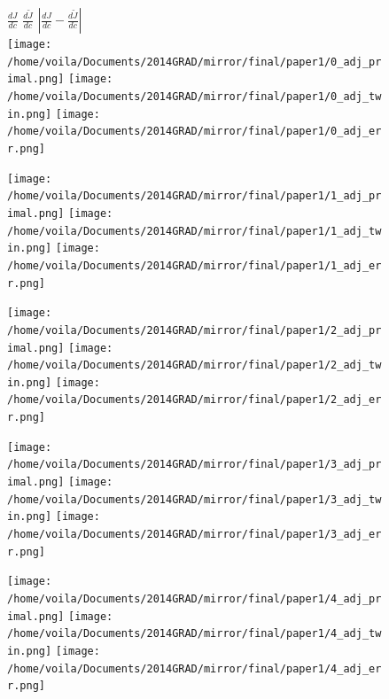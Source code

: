 \documentclass[a4paper,onecolumn]{article}
\theoremstyle{remark}
\begin{document}
\indent \begin{figure}[H]\begin{center}
    $\frac{dJ}{dc}$ \hspace{4.3cm} $\frac{d\tilde{J}}{dc}$  \hspace{4cm} $\left|\frac{dJ}{dc} - \frac{d\tilde{J}}{dc}\right|$\\
    \texttt{[image: /home/voila/Documents/2014GRAD/mirror/final/paper1/0\_adj\_primal.png]}
    \texttt{[image: /home/voila/Documents/2014GRAD/mirror/final/paper1/0\_adj\_twin.png]}
    \texttt{[image: /home/voila/Documents/2014GRAD/mirror/final/paper1/0\_adj\_err.png]}
\end{center}\end{figure}
\vspace{-1cm}
\begin{figure}[H]\begin{center}
    \texttt{[image: /home/voila/Documents/2014GRAD/mirror/final/paper1/1\_adj\_primal.png]}
    \texttt{[image: /home/voila/Documents/2014GRAD/mirror/final/paper1/1\_adj\_twin.png]}
    \texttt{[image: /home/voila/Documents/2014GRAD/mirror/final/paper1/1\_adj\_err.png]}
\end{center}\end{figure}
\vspace{-1cm}
\begin{figure}[H]\begin{center}
    \texttt{[image: /home/voila/Documents/2014GRAD/mirror/final/paper1/2\_adj\_primal.png]}
    \texttt{[image: /home/voila/Documents/2014GRAD/mirror/final/paper1/2\_adj\_twin.png]}
    \texttt{[image: /home/voila/Documents/2014GRAD/mirror/final/paper1/2\_adj\_err.png]}
\end{center}\end{figure}
\vspace{-1cm}
\begin{figure}[H]\begin{center}
    \texttt{[image: /home/voila/Documents/2014GRAD/mirror/final/paper1/3\_adj\_primal.png]}
    \texttt{[image: /home/voila/Documents/2014GRAD/mirror/final/paper1/3\_adj\_twin.png]}
    \texttt{[image: /home/voila/Documents/2014GRAD/mirror/final/paper1/3\_adj\_err.png]}
\end{center}\end{figure}
\vspace{-1cm}
\begin{figure}[H]\begin{center}
    \texttt{[image: /home/voila/Documents/2014GRAD/mirror/final/paper1/4\_adj\_primal.png]}
    \texttt{[image: /home/voila/Documents/2014GRAD/mirror/final/paper1/4\_adj\_twin.png]}
    \texttt{[image: /home/voila/Documents/2014GRAD/mirror/final/paper1/4\_adj\_err.png]}
\end{center}\end{figure}
\end{document}
